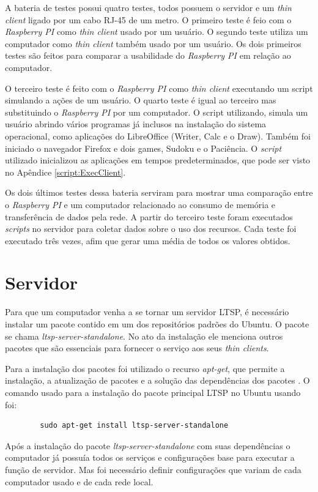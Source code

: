 \documentclass[
	12pt,				%
	openright,			%
	twoside,			%
	a4paper,			%
	chapter=TITLE,		%
	english,			%
	brazil				%
	]{abntex2}
\begin{document}
A bateria de testes possui quatro testes, todos possuem o servidor e um \textit{thin client} ligado por um cabo RJ-45 de um metro. O primeiro teste é feio com o \textit{Raspberry PI} como \textit{thin client} usado por um usuário.  O segundo teste utiliza um computador como \textit{thin client} também usado por um usuário. Os dois primeiros testes são feitos para comparar a usabilidade do \textit{Raspberry PI}  em relação ao computador. 

O terceiro teste é feito com o \textit{Raspberry PI} como \textit{thin client} executando um script simulando a ações de um usuário. O quarto teste é igual ao terceiro mas substituindo o  \textit{Raspberry PI} por um computador. O script utilizando, simula um usuário abrindo vários programas já inclusos na instalação do sistema operacional, como aplicações do LibreOffice (Writer, Calc e o Draw). Também foi iniciado o navegador Firefox e dois games, Sudoku e o Paciência. O \textit{script} utilizado inicializou as aplicações em tempos predeterminados, que pode ser visto no Apêndice \ref{script:ExecClient}.

Os dois últimos testes dessa bateria serviram para mostrar uma comparação entre o \textit{Raspberry PI} e um computador relacionado ao consumo de memória e transferência de dados pela rede. A partir do terceiro teste foram executados \textit{scripts} no servidor para coletar dados sobre o uso dos recursos. Cada teste foi executado três vezes, afim que gerar uma média de todos os valores obtidos. 


\chapter{Servidor}
\label{confServ}
Para que um computador venha a se tornar um servidor LTSP, é necessário instalar um pacote contido em um dos repositórios padrões do Ubuntu. O pacote se chama  \textit{ltsp-server-standalone}. No ato da instalação ele menciona outros pacotes que são  essenciais para fornecer o serviço aos seus \textit{thin clients}.

Para a instalação dos pacotes foi utilizado o recurso \textit{apt-get}, que permite a instalação, a atualização de pacotes e a solução das dependências dos pacotes \cite{apt_get}. O comando usado para a instalação do pacote principal LTSP no Ubuntu usando foi:
\begin{verbatim}
		sudo apt-get install ltsp-server-standalone
\end{verbatim}
Após a instalação do pacote \textit{ltsp-server-standalone} com suas dependências o computador já possuía todos os serviços e configurações base para executar a função de servidor. Mas foi necessário definir configurações que variam de cada computador usado e de cada rede local. 
\end{document}
